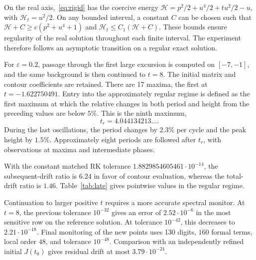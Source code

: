 On the real axis,~\eqref{eq:rigid} has the coercive energy
$\mathcal H=p^2/2+u^4/2+tu^2/2-u$, with $\mathcal H_t=u^2/2$.
On any bounded interval, a constant $C$ can be chosen such that
$\mathcal H+C\ge c(p^2+u^4+1)$ and
$\mathcal H_t\le C_1(\mathcal H+C)$. These bounds ensure regularity
of the real solution throughout each finite interval. The experiment
therefore follows an asymptotic transition on a regular exact solution.

For $\varepsilon=0.2$, passage through the first large excursion is
computed on $[-7,-1]$, and the same background is then continued to
$t=8$. The initial matrix and contour coefficients are retained.
There are 17 maxima, the first at $t=-1.622750491$.
Entry into the approximately regular regime is defined as the first
maximum at which the relative changes in both period and height from
the preceding values are below $5\%$. This is the ninth maximum,
\begin{equation*}
 t_r=4.044134213\ldots.
\end{equation*}
During the last oscillations, the period changes by $2.3\%$ per cycle
and the peak height by $1.5\%$. Approximately eight periods are followed
after $t_r$, with observations at maxima and intermediate phases.

\begin{table}[htbp]\centering\small
\caption{Continuation of $\PII$ from $t=-7$ to $t=8$ with
$\varepsilon=0.2$. The indicators $D_0,D_{\rm osc}$ are defined
in~\eqref{eq:row-drift}.}
\label{tab:transition}
\end{table}
With the constant matched RK tolerance
$1.8829854605461\cdot10^{-14}$, the subsequent-drift ratio is $6.24$
in favor of contour evaluation, whereas the total-drift ratio is $1.46$.
Table~\ref{tab:late} gives pointwise values in the regular regime.
\begin{table}[htbp]\centering\small
\caption{Subsequent drift after $t_r$ for the matched pair.}
\label{tab:late}
\end{table}

Continuation to larger positive $t$ requires a more accurate spectral
monitor. At $t=8$, the previous tolerance $10^{-32}$ gives an error
of $2.52\cdot10^{-6}$ in the most sensitive row on the reference
solution. At tolerance $10^{-42}$, this decreases to $2.21\cdot10^{-18}$.
Final monitoring of the new points uses 130 digits, $160$ formal terms,
local order $48$, and tolerance $10^{-48}$. Comparison with an
independently refined initial $J(t_0)$ gives residual drift at most
$3.79\cdot10^{-24}$.

